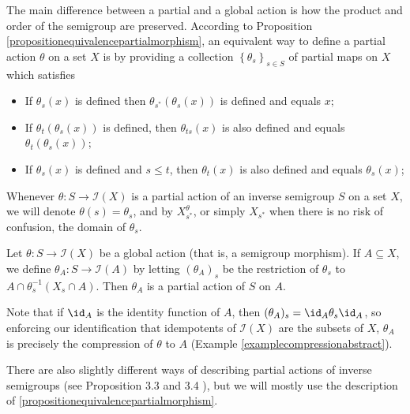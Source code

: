 The main difference between a partial and a global action is how the product and order of the semigroup are preserved. According to Proposition \ref{propositionequivalencepartialmorphism}, an equivalent way to define a partial action $\theta$ on a set $X$ is by providing a collection $\left\{\theta_s\right\}_{s\in S}$ of partial maps on $X$ which satisfies
\begin{itemize}
\item If $\theta_s(x)$ is defined then $\theta_{s^*}(\theta_s(x))$ is defined and equals $x$;
\item If $\theta_t(\theta_s(x))$ is defined, then $\theta_{ts}(x)$ is also defined and equals $\theta_t(\theta_s(x))$;
\item If $\theta_s(x)$ is defined and $s\leq t$, then $\theta_t(x)$ is also defined and equals $\theta_s(x)$;
\end{itemize}

\begin{description}
\item[Convention:] Whenever $\theta:S\to\mathcal{I}(X)$ is a partial action of an inverse semigroup $S$ on a set $X$, we will denote $\theta(s)=\theta_s$, and by $X^\theta_{s^*}$, or simply $X_{s^*}$ when there is no risk of confusion, the domain of $\theta_s$.%
\end{description}

\begin{example}
Let $\theta:S\to\mathcal{I}(X)$ be a global action (that is, a semigroup morphism). If $A\subseteq X$, we define $\theta_A:S\to\mathcal{I}(A)$ by letting $(\theta_A)_s$ be the restriction of $\theta_s$ to $A\cap\theta_s^{-1}(X_s\cap A)$. Then $\theta_A$ is a partial action of $S$ on $A$.

Note that if $\id_A$ is the identity function of $A$, then $(\theta_A)_s=\id_A\theta_s\id_A$, so enforcing our identification that idempotents of $\mathcal{I}(X)$ are the subsets of $X$, $\theta_A$ is precisely the compression of $\theta$ to $A$ (Example \ref{examplecompressionabstract}).
\end{example}

There are also slightly different ways of describing partial actions of inverse semigroups (see Proposition 3.3 and 3.4 \cite{MR3231479}), but we will mostly use the description of \ref{propositionequivalencepartialmorphism}.

